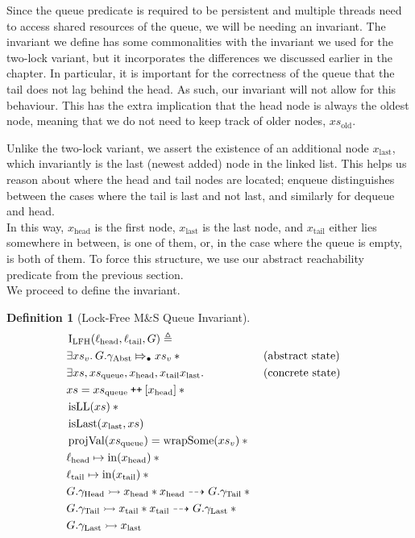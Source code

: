 \documentclass[a4paper, 10pt]{report}
\theoremstyle{definition}
\newtheorem{definition}{Definition}[section]
\newcommand{\msq}{M\&S Queue}
\newcommand{\lfmsq}{Lock-Free \msq{}}
\newcommand{\LFQueueInvariantHocap}{\operatorname{I_{LFH}}}
\newcommand{\xsc}{xs}
\newcommand{\xsqueue}{xs_{\mathrm{queue}}}
\newcommand{\xsold}{xs_{\mathrm{old}}}
\newcommand{\isLL}{\operatorname{isLL}}
\newcommand{\projval}{\operatorname{projVal}}
\newcommand{\wrapsome}{\operatorname{wrapSome}}
\newcommand{\isLast}{\operatorname{isLast}}
\newcommand{\locN}[1]{\loc_{\mathrm{#1}}}
\newcommand{\lochead}{\locN{head}}
\newcommand{\loctail}{\locN{tail}}
\newcommand{\nIn}[1]{\operatorname{in}(#1)}
\newcommand{\node}{x}
\newcommand{\nodeN}[1]{\node_{\mathrm{#1}}}
\newcommand{\nodehead}{\nodeN{head}}
\newcommand{\nodetail}{\nodeN{tail}}
\newcommand{\nodelast}{\nodeN{last}}
\newcommand{\absvalueList}{xs_v}
\newcommand{\Qg}{G}
\newcommand{\gabst}{\gname_{\mathrm{Abst}}}
\newcommand{\ghead}{\gname_{\mathrm{Head}}}
\newcommand{\gtail}{\gname_{\mathrm{Tail}}}
\newcommand{\glast}{\gname_{\mathrm{Last}}}
\newcommand\catenate{\mathbin{\text{\ttfamily\upshape ++}}}
\newcommand{\abstractstateauth}[2]{#1 \Mapsto_{\bullet} #2}
\newcommand{\ar}[2]{#1 \dashrightarrow #2}
\newcommand{\ap}[2]{#1 \rightarrowtail #2}
\begin{document}
Since the queue predicate is required to be persistent and multiple threads need to access shared resources of the queue, we will be needing an invariant. The invariant we define has some commonalities with the invariant we used for the two-lock variant, but it incorporates the differences we discussed earlier in the chapter. In particular, it is important for the correctness of the queue that the tail does not lag behind the head. As such, our invariant will not allow for this behaviour. This has the extra implication that the head node is always the oldest node, meaning that we do not need to keep track of older nodes, $\xsold$.

Unlike the two-lock variant, we assert the existence of an additional node $\nodelast$, which invariantly is the last (newest added) node in the linked list. This helps us reason about where the head and tail nodes are located; enqueue distinguishes between the cases where the tail is last and not last, and similarly for dequeue and head.\\
In this way, $\nodehead$ is the first node, $\nodelast$ is the last node, and $\nodetail$ either lies somewhere in between, is one of them, or, in the case where the queue is empty, is both of them. To force this structure, we use our abstract reachability predicate from the previous section.\\
We proceed to define the invariant.
\begin{definition}[\lfmsq{} Invariant]\label{LFMSQSPECS:pred:invariant}
  \begin{align*}
    &\LFQueueInvariantHocap(\lochead, \loctail, \Qg) \eqdef\\
    &\Exists \absvalueList. \abstractstateauth{\Qg.\gabst}{\absvalueList} \star{} &&\text{(abstract state)}\\
    &\Exists \xsc, \xsqueue, \nodehead, \nodetail \nodelast . &&\text{(concrete state)}\\
    &\xsc = \xsqueue \catenate [\nodehead] \star{}\\
    &\isLL(\xsc) \star{}\\
    &\isLast(\nodelast, \xsc)\\
    &\projval(\xsqueue) = \wrapsome(\absvalueList) \star{}\\
    &\lochead \mapsto \nIn{\nodehead} \star{}\\
    &\loctail \mapsto \nIn{\nodetail} \star{}\\
    &\ap{\Qg.\ghead}{\nodehead} \star{} \ar{\nodehead}{\Qg.\gtail} \star{}\\
    &\ap{\Qg.\gtail}{\nodetail} \star{} \ar{\nodetail}{\Qg.\glast} \star{}\\
    &\ap{\Qg.\glast}{\nodelast}
  \end{align*}
\end{definition}
\end{document}
